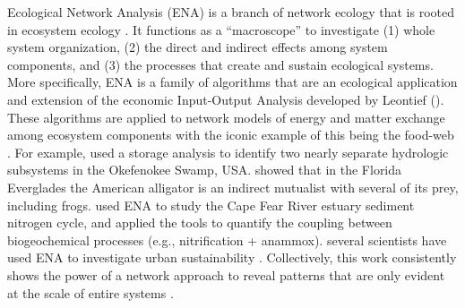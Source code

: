 \documentclass[11pt]{article}
\begin{document}
\begin{spacing}{2}
Ecological Network Analysis (ENA) is a branch of network ecology that
is rooted in ecosystem ecology \citep{borrett12_netecol}.  It functions
as a ``macroscope'' to investigate (1) whole system organization,
(2) the direct and indirect effects among system components, and (3)
the processes that create and sustain ecological systems.  More
specifically, ENA is a family of algorithms that are an ecological
application and extension of the economic Input-Output Analysis
developed by Leontief (\citeyear{leontief66}).  These algorithms are
applied to network models of energy and matter exchange among
ecosystem components with the iconic example of this being the
food-web \citep{patten76, ulanowicz86, fath99_review, hannon73}.
For example, \citet{patten82} used a storage analysis
to identify two nearly separate hydrologic subsystems in the
Okefenokee Swamp, USA.  \citet{bondavalli99} showed that in the
Florida Everglades the American alligator is an indirect mutualist
with several of its prey, including frogs.  \citet{hines12} used
ENA to study the Cape Fear River estuary sediment nitrogen cycle, and applied
the tools to quantify the coupling between biogeochemical processes
(e.g., nitrification + anammox).  
several scientists have used ENA to investigate urban sustainability
\citep{bodini02, zhang10_ecomod, chen12, bodini2012cities}.
Collectively, this work consistently shows the power of a network
approach to reveal patterns that are only evident at the scale of
entire systems \citep{ulanowicz90, patten91, fath07_netconstruction}.


\end{spacing}
\end{document}
